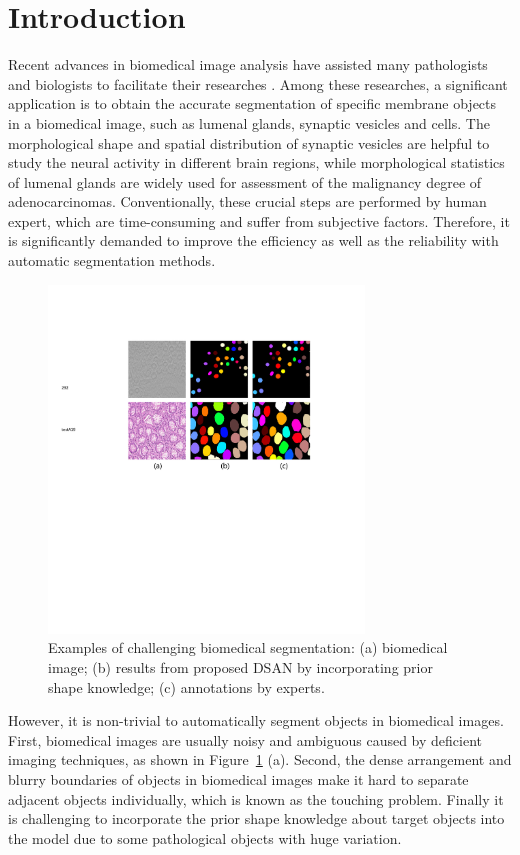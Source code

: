 \section{Introduction}
Recent advances in biomedical image analysis have assisted many pathologists and biologists to facilitate their researches \cite{Chen2016b,Ronneberger2015,Chen2016c,Lieman-Sifry2017,Paszke2016,Tseng2017,Sirinukunwattana2015b}.
Among these researches, a significant application is to obtain the accurate segmentation of specific membrane objects in a biomedical image, such as lumenal glands, synaptic vesicles and cells.
The morphological shape and spatial distribution of synaptic vesicles are helpful to study the neural activity in different brain regions, while morphological statistics of lumenal glands are widely used for assessment of the malignancy degree of adenocarcinomas.
Conventionally, these crucial steps are performed by human expert, which are time-consuming and suffer from subjective factors.
Therefore, it is significantly demanded to improve the efficiency as well as the reliability with automatic segmentation methods.

\begin{figure}
    \begin{center}
        \includegraphics[width=3.3in]{figures/FigImg.pdf}
    \end{center}
    \caption{Examples of challenging biomedical segmentation: (a) biomedical image; (b) results from proposed DSAN by incorporating prior shape knowledge; (c) annotations by experts.}
    \label{FigImgs}
\end{figure}

However, it is non-trivial to automatically segment objects in biomedical images.
First, biomedical images are usually noisy and ambiguous caused by deficient imaging techniques, as shown in Figure~\ref{FigImgs} (a).
Second, the dense arrangement and blurry boundaries of objects in biomedical images make it hard to separate adjacent objects individually, which is known as the touching problem.
Finally it is challenging to incorporate the prior shape knowledge about target objects into the model due to some pathological objects with huge variation.

